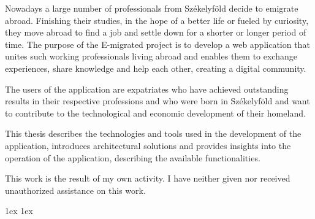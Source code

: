 \documentclass[final]{ubb_dolgozat}
\begin{document}
\begin{abstractEN} %


Nowadays a large number of professionals from Székelyföld decide to emigrate abroad. Finishing their studies, in the hope of a better life or fueled by curiosity, they move abroad to find a job and settle down for a shorter or longer period of time. The purpose of the E-migrated project is to develop a web application that unites such working professionals living abroad and enables them to exchange experiences, share knowledge and help each other, creating a digital community.

The users of the application are expatriates who have achieved outstanding results in their respective professions and who were born in Székelyföld and want to contribute to the technological and economic development of their homeland.

This thesis describes the technologies and tools used in the development of the application, introduces architectural solutions and provides insights into the operation of the application, describing the available functionalities.
\vspace*{.5cm}

This work is the result of my own activity. I have neither given nor received unauthorized assistance on this work.

\end{abstractEN}

\maketitle
{ \baselineskip 1ex
  \parskip 1ex
  \tableofcontents
}



















\appendix



{ \renewcommand{\baselinestretch}{0.8}
  \normalsize 
  \setlength{\itemsep}{-2.4mm}
  \setlength{\bibspacing}{0.67\baselineskip}
  
  
}
\end{document}
